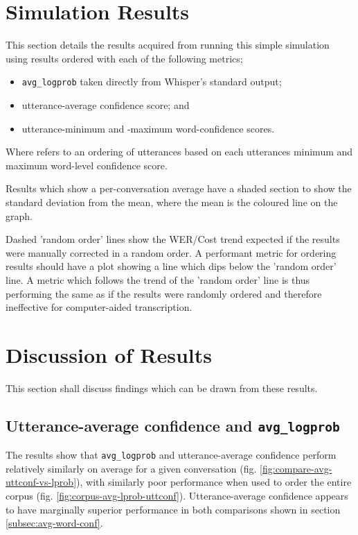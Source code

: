\section{Simulation Results}

This section details the results acquired from running this simple simulation using results ordered with each of the following metrics;

\begin{itemize}
  \item \texttt{avg\_logprob} taken directly from Whisper's standard output;
  \item utterance-average confidence score; and
  \item utterance-minimum and -maximum word-confidence scores.
\end{itemize}

Where  refers to an ordering of utterances based on each utterances minimum and maximum word-level confidence score.

Results which show a per-conversation average have a shaded section to show the standard deviation from the mean, where the mean is the coloured line on the graph.

Dashed 'random order' lines show the WER/Cost trend expected if the results were manually corrected in a random order.
A performant metric for ordering results should have a plot showing a line which dips below the 'random order' line.
A metric which follows the trend of the 'random order' line is thus performing the same as if the results were randomly ordered and therefore ineffective for computer-aided transcription.




\clearpage
\section{Discussion of Results}

This section shall discuss findings which can be drawn from these results.

\subsection{Utterance-average confidence and \texttt{avg\_logprob}}

The results show that \texttt{avg\_logprob} and utterance-average confidence perform relatively similarly on average for a given conversation (fig. \ref{fig:compare-avg-uttconf-vs-lprob}), with similarly poor performance when used to order the entire corpus (fig. \ref{fig:corpus-avg-lprob-uttconf}).
Utterance-average confidence appears to have marginally superior performance in both comparisons shown in section \ref{subsec:avg-word-conf}.

